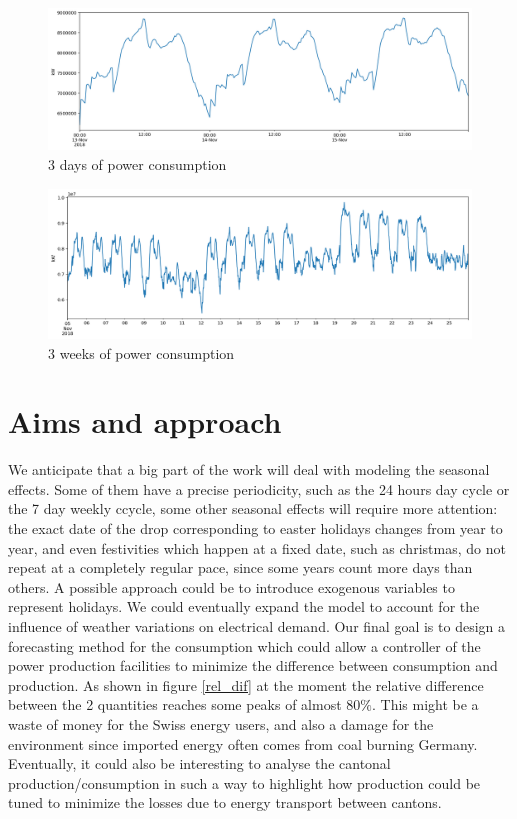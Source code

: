 \documentclass[12pt]{report}
\begin{document}
{\begin{figure}
    \centering
    \includegraphics[width=\textwidth]{daily_seasonality.png}
    \caption{3 days of power consumption}
    \label{daily}
\end{figure}
\begin{figure}
    \centering
    \includegraphics[width=\textwidth]{weekly_seasonality.png}
    \caption{3 weeks of power consumption}
    \label{weekly}
\end{figure}

\section{Aims and approach}
We anticipate that a big part of the work will deal with modeling the seasonal effects. Some of them have a precise periodicity, such as the 24 hours day cycle or the 7 day weekly ccycle, some other seasonal effects will require more attention: the exact date of the drop corresponding to easter holidays changes from year to year, and even festivities which happen at a fixed date, such as christmas, do not repeat at a completely regular pace, since some years count more days than others. A possible approach could be to introduce exogenous variables to represent holidays. We could eventually expand the model to account for the influence of weather variations on electrical demand.
Our final goal is to design a forecasting method for the consumption which could allow a controller of the power production facilities to minimize the difference between consumption and production.
As shown in figure \ref{rel_dif} at the moment the relative difference between the 2 quantities reaches some peaks of almost $80\%$. This might be a waste of money for the Swiss energy users, and also a damage for the environment since imported energy often comes from coal burning Germany.
Eventually, it could also be interesting to analyse the cantonal production/consumption in such a way to highlight how production could be tuned to minimize the losses due to energy transport between cantons.

}
\end{document}
